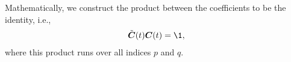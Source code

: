         Mathematically, we construct the product between the coefficients to
        be the identity, i.e.,
        \begin{align}
            \tilde{\vfg{C}}(t)\vfg{C}(t)
            = \1,
            \label{eq:oatdcc-coeff-identity}
        \end{align}
        where this product runs over all indices $p$ and $q$.

